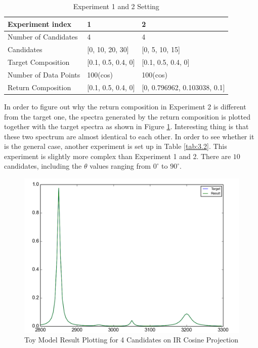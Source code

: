 \begin{table} \label{tab:3.1}
\begin{center}
\begin{tabular}{| l | l | l | }
\hline
Experiment index & 1 & 2  \\
\hline
Number of Candidates & 4 & 4  \\
\hline
Candidates & [0, 10, 20, 30] & [0, 5, 10, 15] \\
\hline
Target Composition & [0.1, 0.5, 0.4, 0] & [0.1, 0.5, 0.4, 0]     \\
\hline
Number of Data Points & 100(cos) &  100(cos)     \\
\hline
Return Composition & [0.1, 0.5, 0.4, 0] & [0, 0.796962, 0.103038, 0.1] \\
\hline
\end{tabular} 
\end{center}
\caption{Experiment 1 and 2 Setting}
\end{table}	

In order to figure out why the return composition in Experiment 2 is different from the target one, the spectra generated by the return composition is plotted together with the target spectra as shown in Figure \ref{fig:3.2}. Interesting thing is that these two spectrum are almost identical to each other. In order to see whether it is the general case, another experiment is set up in Table \ref{tab:3.2}. This experiment is slightly more complex than Experiment 1 and 2. There are $10$ candidates, including the $\theta$ values ranging from $0^{\circ}$ to $90^{\circ}$.  \\

\begin{figure}[!ht] \label{fig:3.2}
\centering
\includegraphics[scale=0.3]{Figures/toy_model_result_plotting_ir_cos_4candi_1.png}
\caption{Toy Model Result Plotting for 4 Candidates on IR Cosine Projection}
\end{figure}

